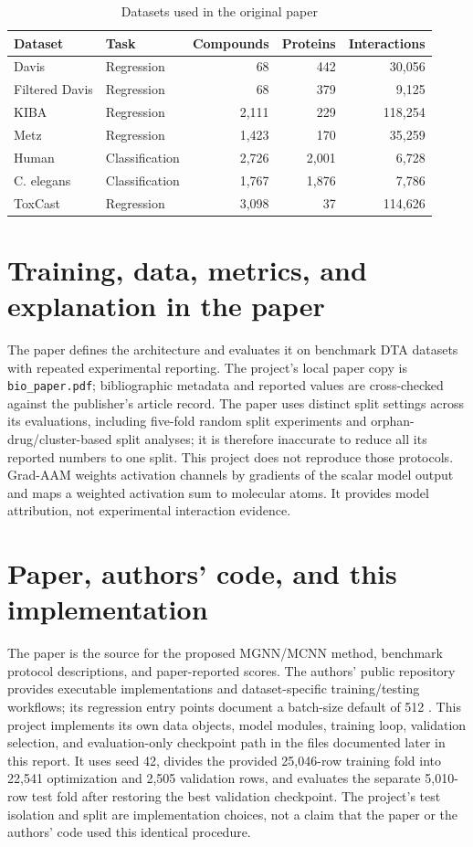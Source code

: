 \begin{table}[H]\centering\small\caption{Datasets used in the original paper}\label{tab:paper-datasets}\begin{tabular}{llrrr}\toprule Dataset & Task & Compounds & Proteins & Interactions\\\midrule Davis & Regression & 68 & 442 & 30,056\\Filtered Davis & Regression & 68 & 379 & 9,125\\KIBA & Regression & 2,111 & 229 & 118,254\\Metz & Regression & 1,423 & 170 & 35,259\\Human & Classification & 2,726 & 2,001 & 6,728\\C. elegans & Classification & 1,767 & 1,876 & 7,786\\ToxCast & Regression & 3,098 & 37 & 114,626\\\bottomrule\end{tabular}\end{table}

\section{Training, data, metrics, and explanation in the paper}
The paper defines the architecture and evaluates it on benchmark DTA datasets with repeated experimental reporting. The project's local paper copy is \texttt{bio\_paper.pdf}; bibliographic metadata and reported values are cross-checked against the publisher's article record. The paper uses distinct split settings across its evaluations, including five-fold random split experiments and orphan-drug/cluster-based split analyses; it is therefore inaccurate to reduce all its reported numbers to one split. This project does not reproduce those protocols. Grad-AAM weights activation channels by gradients of the scalar model output and maps a weighted activation sum to molecular atoms. It provides model attribution, not experimental interaction evidence.

\section{Paper, authors' code, and this implementation}
The paper is the source for the proposed MGNN/MCNN method, benchmark protocol descriptions, and paper-reported scores. The authors' public repository provides executable implementations and dataset-specific training/testing workflows; its regression entry points document a batch-size default of 512 \cite{mgraphdtaauthorscode}. This project implements its own data objects, model modules, training loop, validation selection, and evaluation-only checkpoint path in the files documented later in this report. It uses seed 42, divides the provided 25,046-row training fold into 22,541 optimization and 2,505 validation rows, and evaluates the separate 5,010-row test fold after restoring the best validation checkpoint. The project's test isolation and split are implementation choices, not a claim that the paper or the authors' code used this identical procedure.

